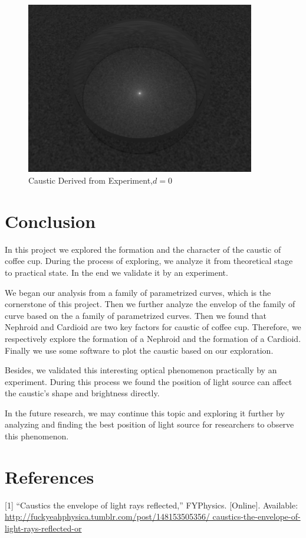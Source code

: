 \documentclass[a4paper]{article}
\begin{document}
      \begin{figure}[!htbp]
        \centering
        \includegraphics[width=10cm]{0005.png}
        \caption{Caustic Derived from Experiment,$d=0$}
        \label{fig:caustic}
    \end{figure}

\section{Conclusion}
In this project we explored the formation and the character of the caustic of coffee cup. During the process of exploring, we analyze it from theoretical stage to practical state. In the end we validate it by an experiment.

We began our analysis from a family of parametrized curves, which is the cornerstone of this project. Then we further analyze the envelop of the family of curve based on the a family of parametrized curves. Then we found that Nephroid and Cardioid are two key factors for caustic of coffee cup. Therefore, we respectively explore the formation of a Nephroid and the formation of a Cardioid. Finally we use some software to plot the caustic based on our exploration. 

Besides, we validated this interesting optical phenomenon practically by an experiment. During this process we found the position of light source can affect the caustic's shape and brightness directly.

In the future research, we may continue this topic and exploring it further by analyzing and finding the best position of light source for researchers to observe this phenomenon.

\section{References}
[1] “Caustics the envelope of light rays reflected,” FYPhysics. [Online]. Available: \url{http://fuckyeahphysica.tumblr.com/post/148153505356/ caustics-the-envelope-of-light-rays-reflected-or}
\end{document}
